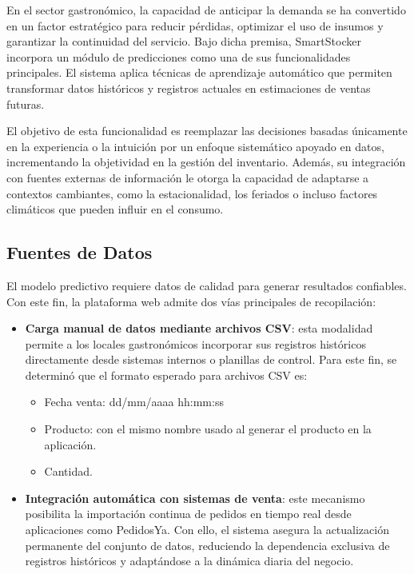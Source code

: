 En el sector gastronómico, la capacidad de anticipar la demanda se ha convertido en un factor estratégico para reducir pérdidas, optimizar el uso de insumos y garantizar la continuidad del servicio. Bajo dicha premisa, SmartStocker incorpora un módulo de predicciones como una de sus funcionalidades principales. El sistema aplica técnicas de aprendizaje automático que permiten transformar datos históricos y registros actuales en estimaciones de ventas futuras. 

El objetivo de esta funcionalidad es reemplazar las decisiones basadas únicamente en la experiencia o la intuición por un enfoque sistemático apoyado en datos, incrementando la objetividad en la gestión del inventario. Además, su integración con fuentes externas de información le otorga la capacidad de adaptarse a contextos cambiantes, como la estacionalidad, los feriados o incluso factores climáticos que pueden influir en el consumo.

\subsection{Fuentes de Datos}\label{sec:fuentes-datos}

El modelo predictivo requiere datos de calidad para generar resultados confiables. Con este fin, la plataforma web admite dos vías principales de recopilación:

\begin{itemize}
    \item \textbf{Carga manual de datos mediante archivos CSV}: esta modalidad permite a los locales gastronómicos incorporar sus registros históricos directamente desde sistemas internos o planillas de control. Para este fin, se determinó que el formato esperado para archivos CSV es:
    \begin{itemize}
        \item Fecha venta: dd/mm/aaaa hh:mm:ss
        \item Producto: con el mismo nombre usado al generar el producto en la aplicación.
        \item Cantidad.
    \end{itemize}

    \item \textbf{Integración automática con sistemas de venta}: este mecanismo posibilita la importación continua de pedidos en tiempo real desde aplicaciones como PedidosYa. Con ello, el sistema asegura la actualización permanente del conjunto de datos, reduciendo la dependencia exclusiva de registros históricos y adaptándose a la dinámica diaria del negocio.
\end{itemize}

